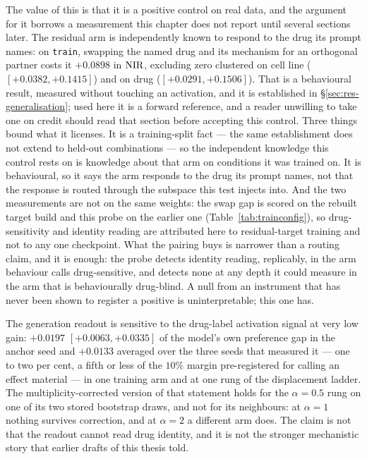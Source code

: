 The value of this is that it is a positive control on real data, and the argument for it borrows a
measurement this chapter does not report until several sections later. The residual arm is
independently known to respond to the drug its prompt names: on \texttt{train}, swapping the named
drug and its mechanism for an orthogonal partner costs it $+0.0898$ in $\textrm{NIR}$, excluding zero
clustered on cell line ($[+0.0382, +0.1415]$) and on drug ($[+0.0291, +0.1506]$). That is a
behavioural result, measured without touching an activation, and it is established in
\S\ref{sec:res-generalisation}; used here it is a forward reference, and a reader unwilling to take
one on credit should read that section before accepting this control. Three things bound what it
licenses. It is a training-split fact --- the same establishment does not extend to held-out
combinations --- so the independent knowledge this control rests on is knowledge about that arm on
conditions it was trained on. It is behavioural, so it says the arm responds to the drug its prompt
names, not that the response is routed through the subspace this test injects into. And the two
measurements are not on the same weights: the swap gap is scored on the rebuilt target build and
this probe on the earlier one (Table~\ref{tab:trainconfig}), so drug-sensitivity and identity
reading are attributed here to residual-target training and not to any one checkpoint. What the
pairing buys is narrower than a routing claim, and it is enough: the probe detects identity reading,
replicably, in the arm behaviour calls drug-sensitive, and detects none at any depth it could
measure in the arm that is behaviourally drug-blind. A null from an instrument that has never been shown to register a
positive is uninterpretable; this one has.

\begin{claim}
The generation readout is sensitive to the drug-label activation signal at very low gain:
$+0.0197$
\nolinebreak[3]$[+0.0063, +0.0335]$ of the model's own preference gap in the anchor seed and
$+0.0133$ averaged over the three seeds that measured it --- one to two per cent, a fifth or less of
the $10\%$ margin pre-registered for calling an effect material --- in one training arm and at one
rung of the displacement ladder. The multiplicity-corrected version of that statement holds for the
$\alpha = 0.5$ rung on one of its two stored bootstrap draws, and not for its neighbours: at
$\alpha = 1$ nothing survives correction, and at
$\alpha = 2$ a different arm does. The claim is not that the readout cannot read drug
identity, and it is not the stronger mechanistic story that earlier drafts of this thesis told.
\end{claim}

